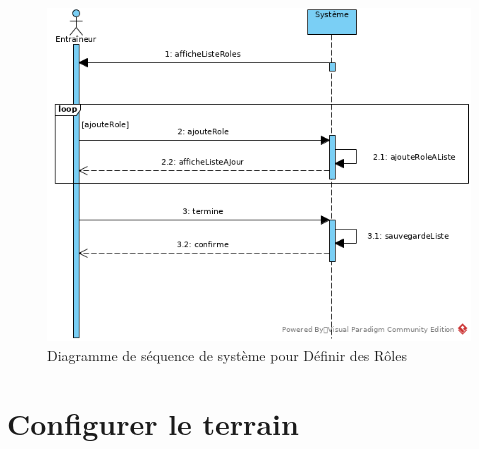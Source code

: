 \begin{figure}[htpb]
    \centering
    \includegraphics[scale=0.5]{fig/ssd_definir_role.png}
    \caption{Diagramme de séquence de système pour Définir des Rôles}
    \label{fig:ssd_definir_role}
\end{figure}


\newpage
\section{Configurer le terrain}
\label{sec:configurer_le_terrain}

